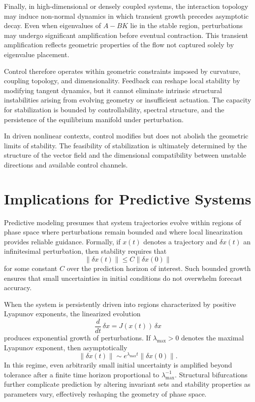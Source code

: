 \documentclass[12pt]{book}
\begin{document}
Finally, in high-dimensional or densely coupled systems, the interaction topology may induce non-normal dynamics in which transient growth precedes asymptotic decay. Even when eigenvalues of $A - BK$ lie in the stable region, perturbations may undergo significant amplification before eventual contraction. This transient amplification reflects geometric properties of the flow not captured solely by eigenvalue placement.

Control therefore operates within geometric constraints imposed by curvature, coupling topology, and dimensionality. Feedback can reshape local stability by modifying tangent dynamics, but it cannot eliminate intrinsic structural instabilities arising from evolving geometry or insufficient actuation. The capacity for stabilization is bounded by controllability, spectral structure, and the persistence of the equilibrium manifold under perturbation.

In driven nonlinear contexts, control modifies but does not abolish the geometric limits of stability. The feasibility of stabilization is ultimately determined by the structure of the vector field and the dimensional compatibility between unstable directions and available control channels.

\section{Implications for Predictive Systems}

Predictive modeling presumes that system trajectories evolve within regions of phase space where perturbations remain bounded and where local linearization provides reliable guidance. Formally, if $x(t)$ denotes a trajectory and $\delta x(t)$ an infinitesimal perturbation, then stability requires that
\[
\|\delta x(t)\| \le C \|\delta x(0)\|
\]
for some constant $C$ over the prediction horizon of interest. Such bounded growth ensures that small uncertainties in initial conditions do not overwhelm forecast accuracy.

When the system is persistently driven into regions characterized by positive Lyapunov exponents, the linearized evolution
\[
\frac{d}{dt}\,\delta x = J(x(t))\,\delta x
\]
produces exponential growth of perturbations. If $\lambda_{\max} > 0$ denotes the maximal Lyapunov exponent, then asymptotically
\[
\|\delta x(t)\| \sim e^{\lambda_{\max} t} \|\delta x(0)\|.
\]
In this regime, even arbitrarily small initial uncertainty is amplified beyond tolerance after a finite time horizon proportional to $\lambda_{\max}^{-1}$. Structural bifurcations further complicate prediction by altering invariant sets and stability properties as parameters vary, effectively reshaping the geometry of phase space.
\end{document}
